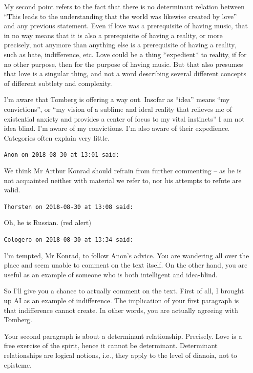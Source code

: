 \begin{footnotesize}
\begin{sffamily}
My second point refers to the fact that there is no determinant relation between ``This leads to the understanding that the world was likewise created by love'' and any previous statement. Even if love was a prerequisite of having music, that in no way means that it is also a prerequisite of having a reality, or more precisely, not anymore than anything else is a prerequisite of having a reality, such as hate, indifference, etc. Love could be a thing *expedient* to reality, if for no other purpose, then for the purpose of having music. But that also presumes that love is a singular thing, and not a word describing several different concepts of different subtlety and complexity.

I'm aware that Tomberg is offering a way out. Insofar as ``idea'' means ``my convictions'', or ``my vision of a sublime and ideal reality that relieves me of existential anxiety and provides a center of focus to my vital instincts'' I am not idea blind. I'm aware of my convictions. I'm also aware of their expedience. Categories often explain very little.

\hfill

\texttt{Anon on 2018-08-30 at 13:01 said:}

We think Mr Arthur Konrad should refrain from further commenting -- as he is not acquainted neither with material we refer to, nor his attempts to refute are valid.

\hfill

\texttt{Thorsten on 2018-08-30 at 13:08 said:}

Oh, he is Russian. (red alert)

\hfill

\texttt{Cologero on 2018-08-30 at 13:34 said:}

I'm tempted, Mr Konrad, to follow Anon's advice. You are wandering all over the place and seem unable to comment on the text itself. On the other hand, you are useful as an example of someone who is both intelligent and idea-blind.

So I'll give you a chance to actually comment on the text. First of all, I brought up AI as an example of indifference. The implication of your first paragraph is that indifference cannot create. In other words, you are actually agreeing with Tomberg.

Your second paragraph is about a determinant relationship. Precisely. Love is a free exercise of the spirit, hence it cannot be determinant. Determinant relationships are logical notions, i.e., they apply to the level of dianoia, not to episteme.


\end{sffamily}
\end{footnotesize}
